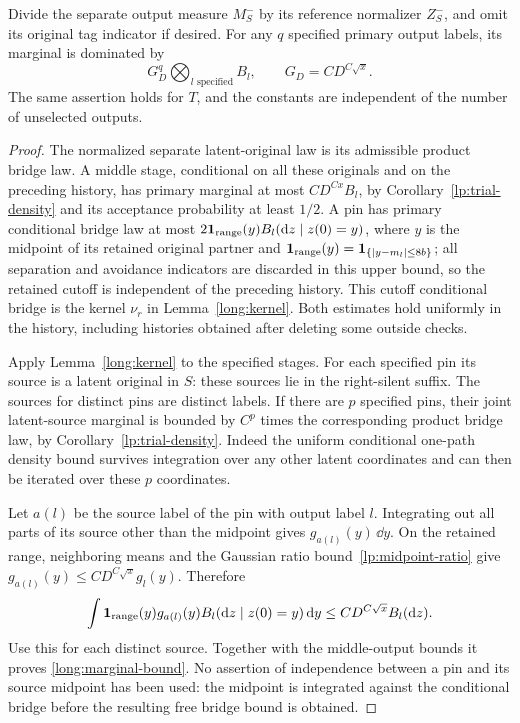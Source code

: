 \begin{lemma}\label{long:shared-density}
Divide the separate output measure $M_S^-$ by its reference normalizer
$Z_S^-$, and omit its original tag indicator if desired.  For any $q$
specified primary output labels, its marginal is dominated by
\begin{equation}\label{long:marginal-bound}
                 G_D^q\bigotimes_{l\text{ specified}} B_l,
              \qquad G_D=C D^{C\sqrt x}.
\end{equation}
The same assertion holds for $T$, and the constants are independent of
the number of unselected outputs.
\end{lemma}
\begin{proof}
The normalized separate latent-original law is its admissible product
bridge law.  A middle stage, conditional on all these originals and on
the preceding history, has primary marginal at most
$C D^{Cx}B_l$, by Corollary~\ref{lp:trial-density} and its acceptance
probability at least $1/2$.  A pin has primary conditional bridge law at
most $2\mathbf 1_{\rm range}(y) B_l(\mathrm d z\mid z(0)=y)$, where $y$ is the
midpoint of its retained original partner and
$\mathbf 1_{\rm range}(y)=\mathbf 1_{\{|y-m_l|\le8b\}}$; all separation and avoidance
indicators are discarded in this upper bound, so the retained cutoff is
independent of the preceding history.  This cutoff conditional bridge is
the kernel $\nu_r$ in Lemma~\ref{long:kernel}.  Both estimates hold
uniformly in the history, including
histories obtained after deleting some outside checks.

Apply Lemma~\ref{long:kernel} to the specified stages.  For each specified
pin its source is a latent original in $S$: these sources lie in the
right-silent suffix.  The sources for distinct pins are distinct labels.
If there are $p$ specified pins, their joint latent-source marginal is
bounded by $C^p$ times the corresponding product bridge law, by
Corollary~\ref{lp:trial-density}.  Indeed the uniform conditional one-path
density bound survives integration over any other latent coordinates and
can then be iterated over these $p$ coordinates.

Let $a(l)$ be the source label of the pin with output label $l$.  Integrating
out all parts of its source other than the midpoint gives
$g_{a(l)}(y)\,\dd y$.  On the retained range, neighboring means and
the Gaussian ratio bound~\eqref{lp:midpoint-ratio} give
$g_{a(l)}(y)\le C D^{C\sqrt x}g_l(y)$.  Therefore
\[
 \int \mathbf 1_{\rm range}(y)g_{a(l)}(y)
           B_l(\mathrm d z\mid z(0)=y)\,\mathrm d y
                         \le C D^{C\sqrt x}B_l(\mathrm d z).
\]
Use this for each distinct source.  Together with the middle-output
bounds it proves \eqref{long:marginal-bound}.  No assertion of independence
between a pin and its source midpoint has been used: the midpoint is
integrated against the conditional bridge before the resulting free
bridge bound is obtained.
\end{proof}

